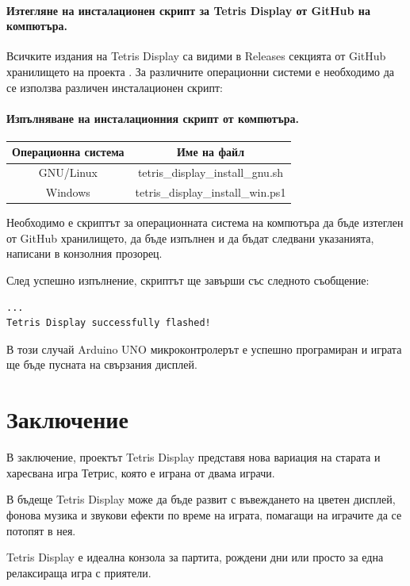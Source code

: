 \documentclass[titlepage, oneside, 14pt]{extbook}
\renewcommand{\texttt}[1]{{\small\ttfamily #1}}
\newcommand{\ard}{Arduino\texttrademark{}}
\begin{document}
\subsubsection{Изтегляне на инсталационен скрипт за Tetris Display от GitHub на компютъра.}

Всичките издания на Tetris Display са видими в Releases секцията от GitHub хранилището на проекта \cite{github}.
За различните операционни системи е необходимо да се използва различен инсталационен скрипт:

\subsubsection{Изпълняване на инсталационния скрипт от компютъра.}

\begin{center}
  \begin{tabular}{c|c}
    Операционна система & Име на файл \\ 
    \hline
    GNU/Linux & \texttt{tetris_display_install_gnu.sh} \\  
    Windows & \texttt{tetris_display_install_win.ps1} \\  
  \end{tabular}
\end{center}

Необходимо е скриптът за операционната система на компютъра да бъде изтеглен от GitHub хранилището,
да бъде изпълнен и да бъдат следвани указанията, написани в конзолния прозорец.

След успешно изпълнение, скриптът ще завърши със следното съобщение:

\begin{verbatim}
...
Tetris Display successfully flashed!
\end{verbatim}

В този случай \ard{} UNO микроконтролерът е успешно програмиран и играта ще бъде пусната на свързания дисплей.

\chapter*{Заключение}

В заключение, проектът Tetris Display представя нова вариация на старата и харесвана игра Тетрис,
която е играна от двама играчи.

В бъдеще Tetris Display може да бъде развит с въвеждането на цветен дисплей, фонова музика и звукови ефекти
по време на играта, помагащи на играчите да се потопят в нея.

\textmd{Tetris Display} е идеална конзола за партита, рождени дни или просто за една релаксираща
игра с приятели.

\printbibliography[heading=bibliography,title={Използвана литература}]

\tableofcontents

\end{document}
